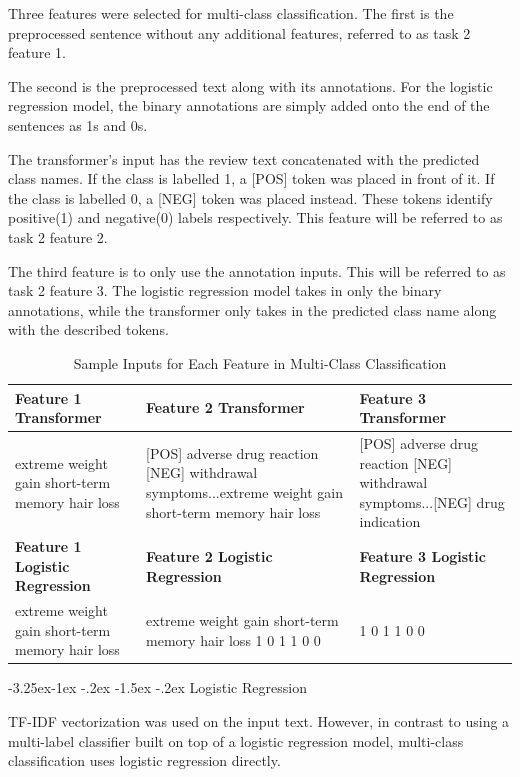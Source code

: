 \documentclass[10.7pt, onecolumn]{article}
\makeatletter
\renewcommand\subsubsection{\@startsection{subsubsection}{3}{\z@}%
	{-3.25ex\@plus -1ex \@minus -.2ex}%
    {-1.5ex \@plus -.2ex}%
    {\normalfont\itshape}}
\makeatother
\begin{document}
Three features were selected for multi-class classification. The first is the preprocessed sentence without any additional features, referred to as task 2 feature 1. 

The second is the preprocessed text along with its annotations. For the logistic regression model, the binary annotations are simply added onto the end of the sentences as 1s and 0s. 

The transformer's input has the review text concatenated with the predicted class names. If the class is labelled 1, a [POS] token was placed in front of it. If the class is labelled 0, a [NEG] token was placed instead. These tokens identify positive(1) and negative(0) labels respectively. This feature will be referred to as task 2 feature 2.

The third feature is to only use the annotation inputs. This will be referred to as task 2 feature 3. The logistic regression model takes in only the binary annotations, while the transformer only takes in the predicted class name along with the described tokens.

\begin{table}[H]
  \centering
  \small
  \begin{tabular}{|p{5cm}|p{5cm}|p{5cm}|}
    \hline
    \textbf{Feature 1 Transformer} & \textbf{Feature 2 Transformer} & \textbf{Feature 3 Transformer} \\
    \hline
    extreme weight gain short-term memory hair loss & [POS] adverse drug reaction [NEG] withdrawal symptoms...extreme weight gain short-term memory hair loss &[POS] adverse drug reaction [NEG] withdrawal symptoms...[NEG] drug indication\\
    \hline
    \textbf{Feature 1 Logistic Regression} & \textbf{Feature 2 Logistic Regression} & \textbf{Feature 3 Logistic Regression} \\
    \hline
    extreme weight gain short-term memory hair loss & extreme weight gain short-term memory hair loss 1 0 1 1 0 0 & 1 0 1 1 0 0\\
    \hline
  \end{tabular}
  \caption{Sample Inputs for Each Feature in Multi-Class Classification}
  \label{tab:multiclassInput}
\end{table}

\subsubsection{Logistic Regression}

TF-IDF vectorization was used on the input text. However, in contrast to using a multi-label classifier built on top of a logistic regression model, multi-class classification uses logistic regression directly.
\end{document}
